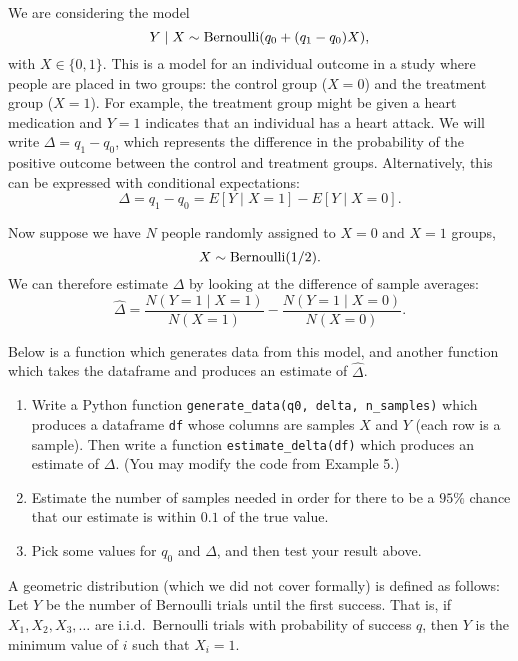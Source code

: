 \begin{exercise}
\begin{exercise} 
We are considering the model
\begin{equation}
Y \mid X \sim {\rm Bernoulli}(q_0 + (q_1-q_0)X),
\end{equation}
with $X \in \{0,1\}$. This is a model for an individual outcome in a study where people are placed in two groups: the control group ($X=0$) and the treatment group ($X=1$). For example, the treatment group might be given a heart medication and $Y=1$ indicates that an individual has a heart attack. We will write $\Delta = q_1 - q_0$, which represents the difference in the probability of the positive outcome between the control and treatment groups. Alternatively, this can be expressed with conditional expectations:
\begin{equation}
\Delta = q_1 - q_0 = E[Y \mid X=1] - E[Y \mid X=0].
\end{equation}

Now suppose we have $N$ people randomly assigned to $X=0$ and $X=1$ groups,
\begin{equation}
X \sim {\rm Bernoulli}(1/2).
\end{equation}
We can therefore estimate $\Delta$ by looking at the difference of sample averages:
\begin{equation}
\widehat{\Delta} = \frac{N(Y=1 \mid X=1)}{N(X=1)} - \frac{N(Y=1 \mid X=0)}{N(X=0)}.
\end{equation}

Below is a function which generates data from this model, and another function which takes the dataframe and produces an estimate of $\widehat{\Delta}$.
\begin{enumerate}
\item Write a Python function \texttt{generate\_data(q0, delta, n\_samples)} which produces a dataframe \texttt{df} whose columns are samples $X$ and $Y$ (each row is a sample). Then write a function \texttt{estimate\_delta(df)} which produces an estimate of $\Delta$. (You may modify the code from Example 5.)
\item Estimate the number of samples needed in order for there to be a $95\%$ chance that our estimate is within $0.1$ of the true value. 
\item Pick some values for $q_0$ and $\Delta$, and then test your result above. 
\end{enumerate}
\end{exercise}


\begin{exercise}
A geometric distribution (which we did not cover formally) is defined as follows:  
Let $Y$ be the number of Bernoulli trials until the first success. That is, if $X_1, X_2, X_3, \ldots$ are i.i.d.\ Bernoulli trials with probability of success $q$, then $Y$ is the minimum value of $i$ such that $X_i = 1$. 


\end{exercise}
\end{exercise}

